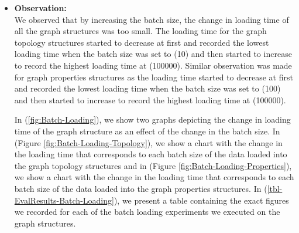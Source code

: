 {\begin{itemize}
\begin{table}[H]
\centering
{}
\caption{Evaluation results of batch loading time of graph structures in seconds.}
\label{tbl-EvalResults-Batch-Loading}
\end{table}


\item \textbf{Observation:}\\
We observed that by increasing the batch size, the change in loading time of all the graph structures was too small. The loading time for the graph topology structures started to decrease at first and recorded the lowest loading time when the batch size was set to (10) and then started to increase to record the highest loading time at (100000). Similar observation was made for graph properties structures as the loading time started to decrease at first and recorded the lowest loading time when the batch size was set to (100) and then started to increase to record the highest loading time at (100000).

In (\ref{fig:Batch-Loading}), we show two graphs depicting the change in loading time of the graph structure as an effect of the change in the batch size. In (Figure \ref{fig:Batch-Loading-Topology}), we show a chart with the change in the loading time that corresponds to each batch size of the data loaded into the graph topology structures and in (Figure \ref{fig:Batch-Loading-Properties}), we show a chart with the change in the loading time that corresponds to each batch size of the data loaded into the graph properties structures. In (\ref{tbl-EvalResults-Batch-Loading}), we present a table containing the exact figures we recorded for each of the batch loading experiments we executed on the graph structures.\\


\end{itemize}}
